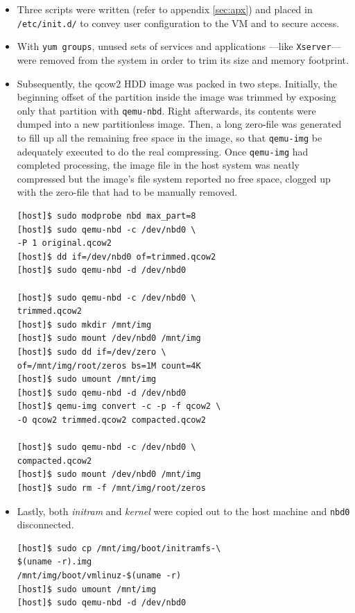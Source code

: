 \documentclass{sig-alternate}
\begin{document}
\begin{itemize}
   \begin{verbatim}
[guest]$ sudo sed -i \
s_^#PermitRootLogin\ yes.*_\
PermitRootLogin\ no_ /etc/ssh/sshd_config
[guest]$ sudo sed -i \
s_^PasswordAuthentication\ yes.*_\
PasswordAuthentication\ no_ \
/etc/ssh/sshd_config
[guest]$ sudo rm -rf /home/hduser/.ssh
[guest]$ sudo rm -f /etc/ssh_host*
   \end{verbatim}
   
 \item Three scripts were written (refer to appendix \ref{sec:apx}) and placed in \texttt{/etc/init.d/} to convey user configuration to the VM and to secure access.
 
 \item With \texttt{yum groups}, unused sets of services and applications ---like \texttt{Xserver}--- were removed from the system in order to trim its size and memory footprint.
 
 \item Subsequently, the qcow2 HDD image was packed in two steps. Initially, the beginning offset of the partition inside the image was trimmed by exposing only that partition with \texttt{qemu-nbd}. Right afterwards, its contents were dumped into a new partitionless image. Then, a long zero-file was generated to fill up all the remaining free space in the image, so that \texttt{qemu-img} be adequately executed to do the real compressing. Once \texttt{qemu-img} had completed processing, the image file in the host system was neatly compressed but the image's file system reported no free space, clogged up with the zero-file that had to be manually removed.
 
   \begin{verbatim}
[host]$ sudo modprobe nbd max_part=8
[host]$ sudo qemu-nbd -c /dev/nbd0 \
-P 1 original.qcow2
[host]$ dd if=/dev/nbd0 of=trimmed.qcow2
[host]$ sudo qemu-nbd -d /dev/nbd0

[host]$ sudo qemu-nbd -c /dev/nbd0 \
trimmed.qcow2
[host]$ sudo mkdir /mnt/img
[host]$ sudo mount /dev/nbd0 /mnt/img
[host]$ sudo dd if=/dev/zero \
of=/mnt/img/root/zeros bs=1M count=4K
[host]$ sudo umount /mnt/img
[host]$ sudo qemu-nbd -d /dev/nbd0
[host]$ qemu-img convert -c -p -f qcow2 \
-O qcow2 trimmed.qcow2 compacted.qcow2

[host]$ sudo qemu-nbd -c /dev/nbd0 \
compacted.qcow2
[host]$ sudo mount /dev/nbd0 /mnt/img
[host]$ sudo rm -f /mnt/img/root/zeros
   \end{verbatim}
   
 \item Lastly, both \emph{initram} and \emph{kernel} were copied out to the host machine and \texttt{nbd0} disconnected.
 
 \begin{verbatim}
[host]$ sudo cp /mnt/img/boot/initramfs-\
$(uname -r).img
/mnt/img/boot/vmlinuz-$(uname -r)
[host]$ sudo umount /mnt/img
[host]$ sudo qemu-nbd -d /dev/nbd0
 \end{verbatim}

\end{itemize}
\end{document}
